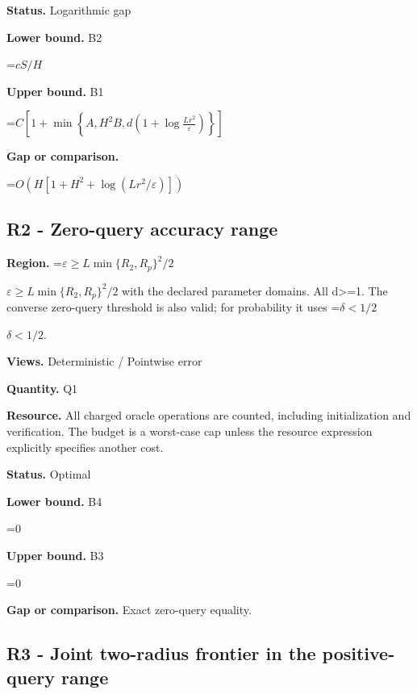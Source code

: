 \documentclass[10pt,a4paper]{article}
\newcommand{\AtlasMath}[1]{\par\begingroup\centering\setbox0=\hbox{$\displaystyle #1$}\ifdim\wd0>1.4\linewidth\typeout{ATLAS WIDE FORMULA: \the\wd0}\fi\ifdim\wd0>\linewidth\resizebox{\linewidth}{!}{\box0}\else\box0\fi\par\endgroup}
\newcommand{\AtlasInlineMath}[1]{\begingroup\setbox0=\hbox{$#1$}\ifdim\wd0>.4\linewidth\endgroup\AtlasMath{#1}\else\endgroup$#1$\fi}
\begin{document}
\textbf{Status.} Logarithmic gap



\textbf{Lower bound.} B2



\AtlasMath{cS/H}


\textbf{Upper bound.} B1



\AtlasMath{C\left[1+\min\left\{A,H^2B,d\left(1+\log\frac{Lr^2}{\varepsilon}\right)\right\}\right]}


\textbf{Gap or comparison.}



\AtlasMath{O\!\left(H[1+H^2+\log(Lr^2/\varepsilon)]\right)}


\subsection{R2 - Zero-query accuracy range}


\textbf{Region.} \AtlasInlineMath{\varepsilon\ge L\min\{R_2,R_p\}^2/2} with the declared parameter domains. All d>=1. The converse zero-query threshold is also valid; for probability it uses \AtlasInlineMath{\delta<1/2}.



\textbf{Views.} Deterministic / Pointwise error



\textbf{Quantity.} Q1



\textbf{Resource.} All charged oracle operations are counted, including initialization and verification. The budget is a worst-case cap unless the resource expression explicitly specifies another cost.



\textbf{Status.} Optimal



\textbf{Lower bound.} B4



\AtlasMath{0}


\textbf{Upper bound.} B3



\AtlasMath{0}


\textbf{Gap or comparison.} Exact zero-query equality.



\subsection{R3 - Joint two-radius frontier in the positive-query range}
\end{document}
